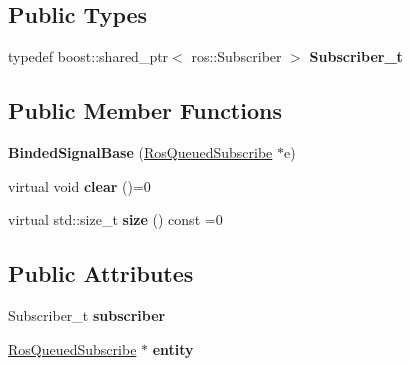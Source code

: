 \subsection*{Public Types}
\begin{DoxyCompactItemize}
\item 
typedef boost\+::shared\+\_\+ptr$<$ ros\+::\+Subscriber $>$ {\bfseries Subscriber\+\_\+t}\hypertarget{structdynamic__graph_1_1internal_1_1BindedSignalBase_a1933d9d9542b368db7cc0bfb9f815aca}{}\label{structdynamic__graph_1_1internal_1_1BindedSignalBase_a1933d9d9542b368db7cc0bfb9f815aca}

\end{DoxyCompactItemize}
\subsection*{Public Member Functions}
\begin{DoxyCompactItemize}
\item 
{\bfseries Binded\+Signal\+Base} (\hyperlink{classdynamic__graph_1_1RosQueuedSubscribe}{Ros\+Queued\+Subscribe} $\ast$e)\hypertarget{structdynamic__graph_1_1internal_1_1BindedSignalBase_a26dec102614700c0ee2e7ad82dade3fe}{}\label{structdynamic__graph_1_1internal_1_1BindedSignalBase_a26dec102614700c0ee2e7ad82dade3fe}

\item 
virtual void {\bfseries clear} ()=0\hypertarget{structdynamic__graph_1_1internal_1_1BindedSignalBase_a65e4a7c402753871fb2b6ca25a4f7b04}{}\label{structdynamic__graph_1_1internal_1_1BindedSignalBase_a65e4a7c402753871fb2b6ca25a4f7b04}

\item 
virtual std\+::size\+\_\+t {\bfseries size} () const =0\hypertarget{structdynamic__graph_1_1internal_1_1BindedSignalBase_acd1d899c6da6c8837f1df5c257d13169}{}\label{structdynamic__graph_1_1internal_1_1BindedSignalBase_acd1d899c6da6c8837f1df5c257d13169}

\end{DoxyCompactItemize}
\subsection*{Public Attributes}
\begin{DoxyCompactItemize}
\item 
Subscriber\+\_\+t {\bfseries subscriber}\hypertarget{structdynamic__graph_1_1internal_1_1BindedSignalBase_ad02d78850a029fc9296536a85c414ccb}{}\label{structdynamic__graph_1_1internal_1_1BindedSignalBase_ad02d78850a029fc9296536a85c414ccb}

\item 
\hyperlink{classdynamic__graph_1_1RosQueuedSubscribe}{Ros\+Queued\+Subscribe} $\ast$ {\bfseries entity}\hypertarget{structdynamic__graph_1_1internal_1_1BindedSignalBase_ad755497fd34b1e59650bc290150ff931}{}\label{structdynamic__graph_1_1internal_1_1BindedSignalBase_ad755497fd34b1e59650bc290150ff931}

\end{DoxyCompactItemize}



